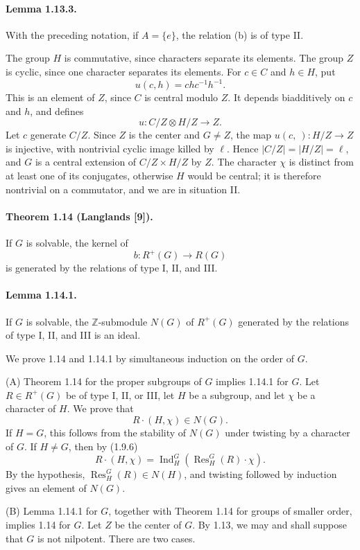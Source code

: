 \documentclass[10pt]{article}
\newcommand{\Z}{\mathbb Z}
\newcommand{\Ind}{\operatorname{Ind}}
\newcommand{\Res}{\operatorname{Res}}
\begin{document}
\paragraph{Lemma 1.13.3.} With the preceding notation, if \(A=\{e\}\), the relation (b) is of type II.

The group \(H\) is commutative, since characters separate its elements. The group \(Z\) is cyclic, since one character separates its elements. For \(c\in C\) and \(h\in H\), put
\[
u(c,h)=chc^{-1}h^{-1}.
\]
This is an element of \(Z\), since \(C\) is central modulo \(Z\). It depends biadditively on \(c\) and \(h\), and defines
\[
u:C/Z\otimes H/Z\longrightarrow Z.
\]
Let \(c\) generate \(C/Z\). Since \(Z\) is the center and \(G\ne Z\), the map \(u(c,\ ):H/Z\to Z\) is injective, with nontrivial cyclic image killed by \(\ell\). Hence \(|C/Z|=|H/Z|=\ell\), and \(G\) is a central extension of \(C/Z\times H/Z\) by \(Z\). The character \(\chi\) is distinct from at least one of its conjugates, otherwise \(H\) would be central; it is therefore nontrivial on a commutator, and we are in situation II.

\paragraph{Theorem 1.14 (Langlands [9]).} If \(G\) is solvable, the kernel of
\[
b:R^+(G)\longrightarrow R(G)
\]
is generated by the relations of type I, II, and III.

\paragraph{Lemma 1.14.1.} If \(G\) is solvable, the \(\Z\)-submodule \(N(G)\) of \(R^+(G)\) generated by the relations of type I, II, and III is an ideal.

We prove 1.14 and 1.14.1 by simultaneous induction on the order of \(G\).

(A) Theorem 1.14 for the proper subgroups of \(G\) implies 1.14.1 for \(G\). Let \(R\in R^+(G)\) be of type I, II, or III, let \(H\) be a subgroup, and let \(\chi\) be a character of \(H\). We prove that
\[
R\cdot(H,\chi)\in N(G).
\]
If \(H=G\), this follows from the stability of \(N(G)\) under twisting by a character of \(G\). If \(H\ne G\), then by (1.9.6)
\[
R\cdot(H,\chi)=\Ind_H^G(\Res_H^G(R)\cdot\chi).
\]
By the hypothesis, \(\Res_H^G(R)\in N(H)\), and twisting followed by induction gives an element of \(N(G)\).

(B) Lemma 1.14.1 for \(G\), together with Theorem 1.14 for groups of smaller order, implies 1.14 for \(G\). Let \(Z\) be the center of \(G\). By 1.13, we may and shall suppose that \(G\) is not nilpotent. There are two cases.
\end{document}
